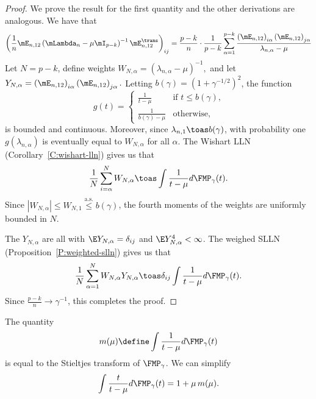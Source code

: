 \begin{proof}
We prove the result for the first quantity and the other derivations are analogous.  We have that
\begin{align*}
    \left(
        \frac{1}{n}
        \mE_{n,12}
        \left(
            \mLambda_n
            -
            \mu \mI_{p-k}
        \right)^{-1}
        \mE_{n,12}^\trans    
    \right)_{ij}
    =
    \frac{p-k}{n}
    \cdot
    \frac{1}{p-k}
    \sum_{\alpha=1}^{p-k}
        \frac{ \left( \mE_{n,12} \right)_{i\alpha}
               \left( \mE_{n,12} \right)_{j\alpha}
             }
             { \lambda_{n,\alpha} - \mu }
\end{align*}
Let $N = p-k$, define weights 
\(
    W_{N,\alpha} = (\lambda_{n,\alpha} - \mu)^{-1},
\)
and let
\(
    Y_{N,\alpha} = \left( \mE_{n,12} \right)_{i\alpha}
                   \left( \mE_{n,12} \right)_{j\alpha}.
\)
Letting $b(\gamma) = \left( 1 + \gamma^{-1/2} \right)^2$, the function
\[
    g(t) 
    = 
    \begin{cases}
        \frac{1}{t - \mu} 
            &\text{if $t \leq b(\gamma)$,} \\
        \frac{1}{b(\gamma) - \mu}
            &\text{otherwise,}
    \end{cases}
\]
is bounded and continuous.  Moreover, since $\lambda_{n,1} \toas b(\gamma)$, with probability one $g(\lambda_{n,\alpha})$ is eventually equal to $W_{N,\alpha}$ for all $\alpha$.  The Wishart LLN (Corollary~\ref{C:wishart-lln}) gives us that
\[
    \frac{1}{N}
    \sum_{i=\alpha}^N W_{N,\alpha}
        \toas
            \int
                \frac{1}{t - \mu} d\FMP_\gamma(t).
\]
Since $| W_{N,\alpha} | \leq W_{N,1} \overset{\text{a.s.}}{\leq} b(\gamma)$, the fourth moments of the weights are uniformly bounded in $N$.  

The $Y_{N,\alpha}$ are all \iid with $\E Y_{N,\alpha} = \delta_{ij}$ and $\E Y_{N,\alpha}^4 < \infty$.  The weighed SLLN (Proposition~\ref{P:weighted-slln}) gives us that
\[
    \frac{1}{N}
    \sum_{\alpha=1}^N
        W_{N,\alpha}
        Y_{N,\alpha}
    \toas
        \delta_{ij}
        \int
            \frac{1}{t - \mu} d\FMP_\gamma(t).
\]
Since $\frac{p-k}{n} \to \gamma^{-1}$, this completes the proof.
\end{proof}

The quantity
\begin{equation}
    m(\mu)
    \define
    \int
        \frac{1}{t - \mu} d\FMP_\gamma(t)
\end{equation}
is equal to the Stieltjes transform of $\FMP_\gamma$.  We can simplify
\[
    \int
        \frac{t}{t - \mu} d\FMP_\gamma(t)
    =
    1 + \mu \, m(\mu).
\]


